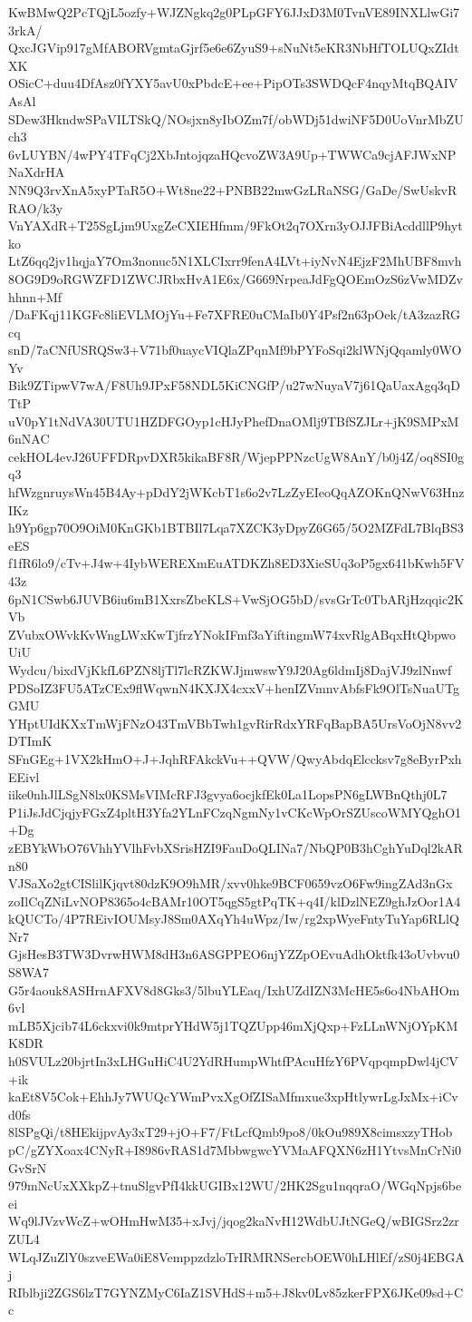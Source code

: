 KwBMwQ2PcTQjL5ozfy+WJZNgkq2g0PLpGFY6JJxD3M0TvnVE89INXLlwGi73rkA/
QxcJGVip917gMfABORVgmtaGjrf5e6e6ZyuS9+sNuNt5eKR3NbHfTOLUQxZIdtXK
OSicC+duu4DfAsz0fYXY5avU0xPbdcE+ee+PipOTs3SWDQcF4nqyMtqBQAIVAsAl
SDew3HkndwSPaVILTSkQ/NOsjxn8yIbOZm7f/obWDj51dwiNF5D0UoVnrMbZUch3
6vLUYBN/4wPY4TFqCj2XbJntojqzaHQcvoZW3A9Up+TWWCa9cjAFJWxNPNaXdrHA
NN9Q3rvXnA5xyPTaR5O+Wt8ne22+PNBB22mwGzLRaNSG/GaDe/SwUskvRRAO/k3y
VnYAXdR+T25SgLjm9UxgZeCXIEHfmm/9FkOt2q7OXrn3yOJJFBiAcddllP9hytko
LtZ6qq2jv1hqjaY7Om3nonuc5N1XLCIxrr9fenA4LVt+iyNvN4EjzF2MhUBF8mvh
8OG9D9oRGWZFD1ZWCJRbxHvA1E6x/G669NrpeaJdFgQOEmOzS6zVwMDZvhhnn+Mf
/DaFKqj11KGFc8liEVLMOjYu+Fe7XFRE0uCMaIb0Y4Psf2n63pOek/tA3zazRGcq
snD/7aCNfUSRQSw3+V71bf0uaycVIQlaZPqnMf9bPYFoSqi2klWNjQqamly0WOYv
Bik9ZTipwV7wA/F8Uh9JPxF58NDL5KiCNGfP/u27wNuyaV7j61QaUaxAgq3qDTtP
uV0pY1tNdVA30UTU1HZDFGOyp1cHJyPhefDnaOMlj9TBfSZJLr+jK9SMPxM6nNAC
cekHOL4evJ26UFFDRpvDXR5kikaBF8R/WjepPPNzcUgW8AnY/b0j4Z/oq8SI0gq3
hfWzgnruysWn45B4Ay+pDdY2jWKcbT1s6o2v7LzZyEIeoQqAZOKnQNwV63HnzIKz
h9Yp6gp70O9OiM0KnGKb1BTBIl7Lqa7XZCK3yDpyZ6G65/5O2MZFdL7BlqBS3eES
f1fR6lo9/cTv+J4w+4IybWEREXmEuATDKZh8ED3XieSUq3oP5gx641bKwh5FV43z
6pN1CSwb6JUVB6iu6mB1XxrsZbeKLS+VwSjOG5bD/svsGrTc0TbARjHzqqic2KVb
ZVubxOWvkKvWngLWxKwTjfrzYNokIFmf3aYiftingmW74xvRlgABqxHtQbpwoUiU
Wydcu/bixdVjKkfL6PZN8ljTl7lcRZKWJjmwswY9J20Ag6ldmIj8DajVJ9zlNnwf
PDSoIZ3FU5ATzCEx9flWqwnN4KXJX4cxxV+henIZVmnvAbfsFk9OlTsNuaUTgGMU
YHptUIdKXxTmWjFNzO43TmVBbTwh1gvRirRdxYRFqBapBA5UrsVoOjN8vv2DTImK
SFnGEg+1VX2kHmO+J+JqhRFAkckVu++QVW/QwyAbdqElccksv7g8eByrPxhEEivl
iike0nhJlLSgN8lx0KSMsVIMcRFJ3gvya6ocjkfEk0La1LopsPN6gLWBnQthj0L7
P1iJsJdCjqjyFGxZ4pltH3Yfa2YLnFCzqNgmNy1vCKcWpOrSZUscoWMYQghO1+Dg
zEBYkWbO76VhhYVlhFvbXSrisHZI9FauDoQLINa7/NbQP0B3hCghYuDql2kARn80
VJSaXo2gtCISlilKjqvt80dzK9O9hMR/xvv0hke9BCF0659vzO6Fw9ingZAd3nGx
zoIlCqZNiLvNOP8365o4cBAMr10OT5qgS5gtPqTK+q4I/klDzlNEZ9ghJzOor1A4
kQUCTo/4P7REivIOUMsyJ8Sm0AXqYh4uWpz/Iw/rg2xpWyeFntyTuYap6RLlQNr7
GjsHesB3TW3DvrwHWM8dH3n6ASGPPEO6njYZZpOEvuAdhOktfk43oUvbvu0S8WA7
G5r4aouk8ASHrnAFXV8d8Gks3/5lbuYLEaq/IxhUZdIZN3McHE5s6o4NbAHOm6vl
mLB5Xjcib74L6ckxvi0k9mtprYHdW5j1TQZUpp46mXjQxp+FzLLnWNjOYpKMK8DR
h0SVULz20bjrtIn3xLHGuHiC4U2YdRHumpWhtfPAcuHfzY6PVqpqmpDwl4jCV+ik
kaEt8V5Cok+EhhJy7WUQcYWmPvxXgOfZISaMfmxue3xpHtlywrLgJxMx+iCvd0fs
8lSPgQi/t8HEkijpvAy3xT29+jO+F7/FtLcfQmb9po8/0kOu989X8cimsxzyTHob
pC/gZYXoax4CNyR+I8986vRAS1d7MbbwgwcYVMaAFQXN6zH1YtvsMnCrNi0GvSrN
979mNcUxXXkpZ+tnuSlgvPfI4kkUGIBx12WU/2HK2Sgu1nqqraO/WGqNpjs6beei
Wq9lJVzvWcZ+wOHmHwM35+xJvj/jqog2kaNvH12WdbUJtNGeQ/wBIGSrz2zrZUL4
WLqJZuZlY0szveEWa0iE8VemppzdzloTrIRMRNSercbOEW0hLHlEf/zS0j4EBGAj
RIblbji2ZGS6lzT7GYNZMyC6IaZ1SVHdS+m5+J8kv0Lv85zkerFPX6JKe09sd+Cc
